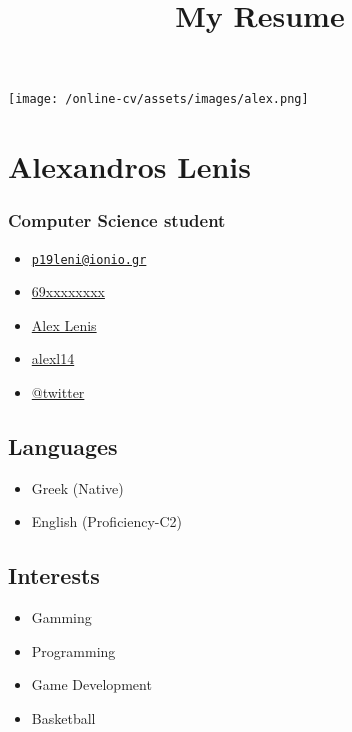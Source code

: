 \documentclass[english,]{article}
\title{My Resume}
\date{}
\providecommand{\tightlist}{%
  \setlength{\itemsep}{0pt}\setlength{\parskip}{0pt}}
\begin{document}
\maketitle

\texttt{[image: /online-cv/assets/images/alex.png]}

\hypertarget{alexandros-lenis}{%
\section{Alexandros Lenis}\label{alexandros-lenis}}

\hypertarget{computer-science-student}{%
\subsubsection{Computer Science
student}\label{computer-science-student}}

\begin{itemize}
\tightlist
\item
  \emph{} \href{mailto:p19leni@ionio.gr}{\nolinkurl{p19leni@ionio.gr}}
\item
  \emph{} \href{tel:69xxxxxxxx}{69xxxxxxxx}
\item
  \emph{} \href{https://linkedin.com/in/Alex\%20Lenis}{Alex Lenis}
\item
  \emph{} \href{http://github.com/alexl14}{alexl14}
\item
  \emph{} \href{https://twitter.com/@twitter}{@twitter}
\end{itemize}

\hypertarget{languages}{%
\subsection{Languages}\label{languages}}

\begin{itemize}
\tightlist
\item
  Greek {(Native)}
\item
  English {(Proficiency-C2)}
\end{itemize}

\hypertarget{interests}{%
\subsection{Interests}\label{interests}}

\begin{itemize}
\tightlist
\item
  Gamming
\item
  Programming
\item
  Game Development
\item
  Basketball
\end{itemize}
\end{document}
